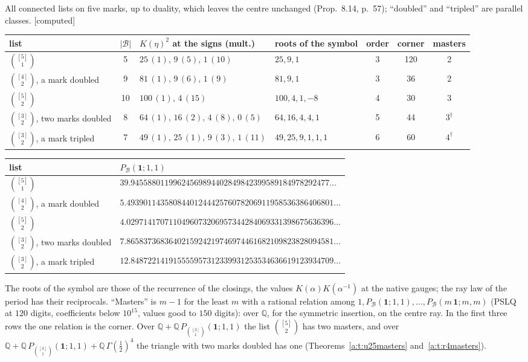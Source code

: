 \documentclass[11pt]{article}
\newcommand{\cB}{\mathcal B}
\newcommand{\one}{\mathbf 1}
\newcommand{\Pc}[1]{P_{\cB}(#1\,\one;#1,#1)}
\newcommand{\Pth}{P_{\binom{[3]}1}(\one;1,1)}
\theoremstyle{plain}
\theoremstyle{definition}
\theoremstyle{remark}
\newcommand{\computed}{\textup{[computed]}}
\begin{document}
All connected lists on five marks, up to duality, which leaves the centre unchanged (Prop.~8.14, p.~57); ``doubled'' and ``tripled'' are parallel classes. \computed
\begin{center}
\small
\begin{tabular}{@{}l c l l c c c@{}}
\toprule
list & $|\cB|$ & $K(\eta)^2$ at the signs (mult.) & roots of the symbol & order & corner & masters\\ \midrule
$\binom{[5]}1$ & 5 & $25\,(1),\,9\,(5),\,1\,(10)$ & $25,9,1$ & 3 & 120 & 2\\
$\binom{[4]}2$, a mark doubled & 9 & $81\,(1),\,9\,(6),\,1\,(9)$ & $81,9,1$ & 3 & 36 & 2\\
$\binom{[5]}2$ & 10 & $100\,(1),\,4\,(15)$ & $100,4,1,-8$ & 4 & 30 & 3\\
$\binom{[3]}2$, two marks doubled & 8 & $64\,(1),\,16\,(2),\,4\,(8),\,0\,(5)$ & $64,16,4,4,1$ & 5 & 44 & $3^\dagger$\\
$\binom{[3]}2$, a mark tripled & 7 & $49\,(1),\,25\,(1),\,9\,(3),\,1\,(11)$ & $49,25,9,1,1,1$ & 6 & 60 & $4^\dagger$\\
\bottomrule
\end{tabular}

\medskip
\begin{tabular}{@{}l l@{}}
\toprule
list & $P_{\cB}(\one;1,1)$\\ \midrule
$\binom{[5]}1$ & $39.94558801199624569894402849842399589184978292477\ldots$\\
$\binom{[4]}2$, a mark doubled & $5.4939011435808440124442576078206911958536386406801\ldots$\\
$\binom{[5]}2$ & $4.0297141707110496073206957344284069331398675636396\ldots$\\
$\binom{[3]}2$, two marks doubled & $7.8658373683640215924219746974461682109823828094581\ldots$\\
$\binom{[3]}2$, a mark tripled & $12.848722141915555957312339931253534636619123934709\ldots$\\
\bottomrule
\end{tabular}
\end{center}
The roots of the symbol are those of the recurrence of the closings, the values $K(\alpha)K(\alpha^{-1})$ at the native gauges; the ray law of the period has their reciprocals. ``Masters'' is $m-1$ for the least $m$ with a rational relation among $1,P_{\cB}(\one;1,1),\dots,\Pc m$ (PSLQ at $120$ digits, coefficients below $10^{15}$, values good to $150$ digits): over $\mathbb Q$, for the symmetric insertion, on the centre ray. In the first three rows the one relation is the corner. Over $\mathbb Q+\mathbb Q\,\Pth$ the list $\binom{[5]}2$ has two masters, and over $\mathbb Q+\mathbb Q\,\Pth+\mathbb Q\,\Gamma(\frac12)^4$ the triangle with two marks doubled has one (Theorems~\ref{a:t:u25masters} and~\ref{a:t:r4masters}).
\end{document}
